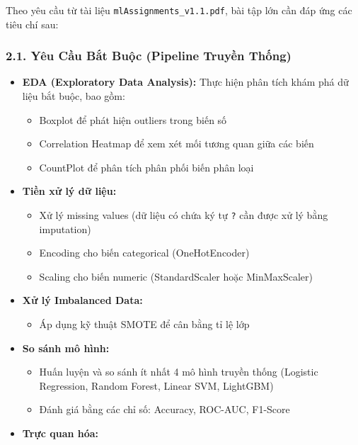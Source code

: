 \documentclass[
]{article}
\providecommand{\tightlist}{%
  \setlength{\itemsep}{0pt}\setlength{\parskip}{0pt}}
\begin{document}
Theo yêu cầu từ tài liệu \texttt{mlAssignments\_v1.1.pdf}, bài tập lớn
cần đáp ứng các tiêu chí sau:

\subsubsection{2.1. Yêu Cầu Bắt Buộc (Pipeline Truyền
Thống)}\label{21-yuxeau-cux1ea7u-bux1eaft-buux1ed9c-pipeline-truyux1ec1n-thux1ed1ng}

\begin{itemize}
\item
  \textbf{EDA (Exploratory Data Analysis):} Thực hiện phân tích khám phá
  dữ liệu bắt buộc, bao gồm:

  \begin{itemize}
  \tightlist
  \item
    Boxplot để phát hiện outliers trong biến số
  \item
    Correlation Heatmap để xem xét mối tương quan giữa các biến
  \item
    CountPlot để phân tích phân phối biến phân loại
  \end{itemize}
\item
  \textbf{Tiền xử lý dữ liệu:}

  \begin{itemize}
  \tightlist
  \item
    Xử lý missing values (dữ liệu có chứa ký tự \texttt{?} cần được xử
    lý bằng imputation)
  \item
    Encoding cho biến categorical (OneHotEncoder)
  \item
    Scaling cho biến numeric (StandardScaler hoặc MinMaxScaler)
  \end{itemize}
\item
  \textbf{Xử lý Imbalanced Data:}

  \begin{itemize}
  \tightlist
  \item
    Áp dụng kỹ thuật SMOTE để cân bằng tỉ lệ lớp
  \end{itemize}
\item
  \textbf{So sánh mô hình:}

  \begin{itemize}
  \tightlist
  \item
    Huấn luyện và so sánh ít nhất 4 mô hình truyền thống (Logistic
    Regression, Random Forest, Linear SVM, LightGBM)
  \item
    Đánh giá bằng các chỉ số: Accuracy, ROC-AUC, F1-Score
  \end{itemize}
\item
  \textbf{Trực quan hóa:}


\end{itemize}
\end{document}
